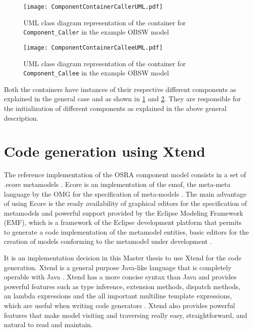 \begin{figure}[h]
	\centering
	\texttt{[image: ComponentContainerCallerUML.pdf]}
	\caption{UML class diagram representation of the container for \texttt{Component\allowbreak \_Caller} in the example OBSW model}
	\label{fig: Component container caller UML}
\end{figure}

\begin{figure}[h]
	\centering
	\texttt{[image: ComponentContainerCalleeUML.pdf]}
	\caption{UML class diagram representation of the container for \texttt{Component\allowbreak \_Callee} in the example OBSW model}
	\label{fig: Component container callee UML}
\end{figure}

Both the containers have instances of their respective different components as explained in the general case and as shown in \cref{fig: Component container caller UML} and \cref{fig: Component container callee UML}. They are responsible for the initialization of different components as explained in the above general description.  

\section{Code generation using Xtend}
\label{section: code generation}
The reference implementation of the OSRA component model consists in a set of .ecore metamodels \cite{SpecMetamodel}. Ecore is an implementation of the \ac{emof}, the meta-meta language by the OMG for the specification of meta-models \cite{SpecMetamodel}. The main advantage of using Ecore is the ready availability of graphical editors for the specification of metamodels and powerful support provided by the Eclipse Modeling Framework (EMF), which is a framework of the Eclipse development platform that permits to generate a code implementation of the metamodel entities, basic editors for the creation of models conforming to the metamodel under development \cite{SpecMetamodel}. 

It is an implementation decision in this Master thesis to use Xtend for the code generation. Xtend is a general purpose Java-like language that is completely operable with Java \cite{Xtend}\cite{XtendDoc}. Xtend has a more concise syntax than Java and provides powerful features such as type inference, extension methods, dispatch methods, an lambda expressions and the all important multiline template expressions, which are useful when writing code generators \cite{Xtend}\cite{XtendDoc}. Xtend also provides powerful features that make model visiting and traversing really easy, straightforward, and natural to read and maintain. 

